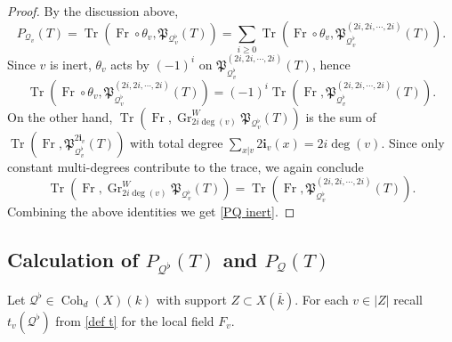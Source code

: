\documentclass[reqno]{amsart}
\numberwithin{equation}{section}
\DeclareMathOperator{\Frob}{Fr}
\DeclareMathOperator{\Tr}{Tr}
\DeclareMathOperator{\Gr}{Gr}
\DeclareMathOperator{\Coh}{Coh}
\newcommand{\bi}{\mathbf{i}}
\newcommand{\ov}{\overline}
\renewcommand\c{\circ}
\renewcommand{\th}{\theta}
\newcommand\cQ{\mathcal{Q}}
\newcommand\frP{\mathfrak{P}}
\theoremstyle{remark}
\numberwithin{equation}{section}
\begin{document}
\begin{proof}
By the discussion above,
\begin{equation*}
P_{\cQ_{v}}(T)=\Tr(\Frob\c\th_{v},  \frP_{\cQ^{\flat}_{v}}(T))=\sum_{i\ge0}\Tr(\Frob\c\th_{v}, \frP^{(2i,2i,\cdots,2i)}_{\cQ^{\flat}_{v}}(T)).
\end{equation*}
Since $v$ is inert, $\th_{v}$ acts by $(-1)^{i}$ on $\frP^{(2i,2i,\cdots,2i)}_{\cQ^{\flat}_{v}}(T)$, hence
\begin{equation*}
\Tr(\Frob\c\th_{v}, \frP^{(2i,2i,\cdots,2i)}_{\cQ^{\flat}_{v}}(T))=(-1)^{i}\Tr(\Frob, \frP^{(2i,2i,\cdots,2i)}_{\cQ^{\flat}_{v}}(T)).
\end{equation*}
On the other hand,  $\Tr(\Frob, \Gr^{W}_{2i\deg(v)}\frP_{\cQ^{\flat}_{v}}(T))$ is the sum of $\Tr(\Frob, \frP^{2\bi_{v}}_{\cQ^{\flat}_{v}}(T))$ with total degree $\sum_{x|v}2\bi_{v}(x)=2i\deg(v)$. Since only constant multi-degrees contribute to the trace, we again conclude
\begin{equation*}
\Tr(\Frob, \Gr^{W}_{2i\deg(v)}\frP_{\cQ^{\flat}_{v}}(T))=\Tr(\Frob, \frP^{(2i,2i,\cdots,2i)}_{\cQ^{\flat}_{v}}(T)).
\end{equation*}
Combining the above identities we get \eqref{PQ inert}.
\end{proof}




\subsection{Calculation of $P_{\cQ^{\flat}}(T)$ and $P_{\cQ}(T)$}

Let $\cQ^{\flat}\in \Coh_{d}(X)(k)$ with support $Z\subset X(\ov k)$. For each $v\in |Z|$ recall $t_{v}(\cQ^{\flat})$ from \eqref{def t} for the local field $F_{v}$. 
\end{document}
